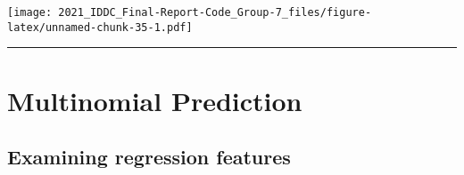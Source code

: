 \documentclass[
]{article}
\newenvironment{Shaded}{\begin{snugshade}}{\end{snugshade}}
\newcommand{\DataTypeTok}[1]{\textcolor[rgb]{0.13,0.29,0.53}{#1}}
\newcommand{\DecValTok}[1]{\textcolor[rgb]{0.00,0.00,0.81}{#1}}
\newcommand{\FloatTok}[1]{\textcolor[rgb]{0.00,0.00,0.81}{#1}}
\newcommand{\KeywordTok}[1]{\textcolor[rgb]{0.13,0.29,0.53}{\textbf{#1}}}
\newcommand{\NormalTok}[1]{#1}
\newcommand{\OperatorTok}[1]{\textcolor[rgb]{0.81,0.36,0.00}{\textbf{#1}}}
\newcommand{\OtherTok}[1]{\textcolor[rgb]{0.56,0.35,0.01}{#1}}
\newcommand{\StringTok}[1]{\textcolor[rgb]{0.31,0.60,0.02}{#1}}
\begin{document}
\begin{Shaded}
\end{Shaded}

\texttt{[image: 2021\_IDDC\_Final-Report-Code\_Group-7\_files/figure-latex/unnamed-chunk-35-1.pdf]}

\begin{center}\rule{0.5\linewidth}{0.5pt}\end{center}

\hypertarget{multinomial-prediction}{%
\section{Multinomial Prediction}\label{multinomial-prediction}}

\hypertarget{examining-regression-features}{%
\subsection{Examining regression
features}\label{examining-regression-features}}
\end{document}
